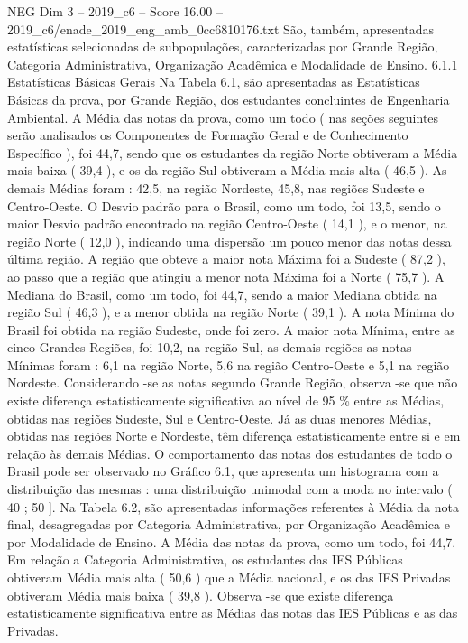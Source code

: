 \begin{textsample}{NEG Dim 3 – 2019\_c6 – Score 16.00 – 2019\_c6/enade\_2019\_eng\_amb\_0cc6810176.txt}
São, também, apresentadas estatísticas selecionadas de subpopulações, caracterizadas por Grande Região, Categoria Administrativa, Organização Acadêmica e Modalidade de Ensino. 6.1.1 Estatísticas Básicas Gerais Na Tabela 6.1, são apresentadas as Estatísticas Básicas da prova, por Grande Região, dos estudantes concluintes de Engenharia Ambiental.
A Média das notas da prova, como um todo ( nas seções seguintes serão analisados os Componentes de Formação Geral e de Conhecimento Específico ), foi 44,7, sendo que os estudantes da região Norte obtiveram a Média mais baixa ( 39,4 ), e os da região Sul obtiveram a Média mais alta ( 46,5 ).
As demais Médias foram : 42,5, na região Nordeste, 45,8, nas regiões Sudeste e Centro-Oeste.
O Desvio padrão para o Brasil, como um todo, foi 13,5, sendo o maior Desvio padrão encontrado na região Centro-Oeste ( 14,1 ), e o menor, na região Norte ( 12,0 ), indicando uma dispersão um pouco menor das notas dessa última região.
A região que obteve a maior nota Máxima foi a Sudeste ( 87,2 ), ao passo que a região que atingiu a menor nota Máxima foi a Norte ( 75,7 ).
A Mediana do Brasil, como um todo, foi 44,7, sendo a maior Mediana obtida na região Sul ( 46,3 ), e a menor obtida na região Norte ( 39,1 ).
A nota Mínima do Brasil foi obtida na região Sudeste, onde foi zero.
A maior nota Mínima, entre as cinco Grandes Regiões, foi 10,2, na região Sul, as demais regiões as notas Mínimas foram : 6,1 na região Norte, 5,6 na região Centro-Oeste e 5,1 na região Nordeste.
Considerando -se as notas segundo Grande Região, observa -se que não existe diferença estatisticamente significativa ao nível de 95 \% entre as Médias, obtidas nas regiões Sudeste, Sul e Centro-Oeste.
Já as duas menores Médias, obtidas nas regiões Norte e Nordeste, têm diferença estatisticamente entre si e em relação às demais Médias.
O comportamento das notas dos estudantes de todo o Brasil pode ser observado no Gráfico 6.1, que apresenta um histograma com a distribuição das mesmas : uma distribuição unimodal com a moda no intervalo ( 40 ; 50 ].
Na Tabela 6.2, são apresentadas informações referentes à Média da nota final, desagregadas por Categoria Administrativa, por Organização Acadêmica e por Modalidade de Ensino.
A Média das notas da prova, como um todo, foi 44,7.
Em relação a Categoria Administrativa, os estudantes das IES Públicas obtiveram Média mais alta ( 50,6 ) que a Média nacional, e os das IES Privadas obtiveram Média mais baixa ( 39,8 ).
Observa -se que existe diferença estatisticamente significativa entre as Médias das notas das IES Públicas e as das Privadas.

\end{textsample}
